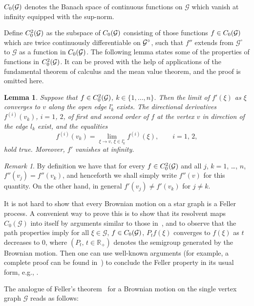 \documentclass[11pt,a4paper]{amsart}
\newcommand{\cG}{\mathcal{G}}
\newcommand{\1}{1}
\newcommand{\R}{\mathbb{R}}
\newtheorem{lemma}[theorem]{Lemma}
\theoremstyle{remark}
\newtheorem{remark}[theorem]{Remark}
\newcommand{\op}{\ensuremath^\circ}
\newcommand{\cGo}{\ensuremath\cG\op}
\newcommand{\Co}{\ensuremath C_0(\cG)}
\newcommand{\Cii}{\ensuremath C_0^2(\cG)}
\numberwithin{equation}{section}
\begin{document}
$\Co$ denotes the Banach space of continuous functions on $\cG$ which vanish at infinity
equipped with the sup-norm.

Define $\Cii$ as the subspace of $\Co$ consisting of those
functions $f\in\Co$ which are twice continuously differentiable on $\cGo$, such that
$f''$ extends from $\cG^\circ$ to $\cG$ as a function in $\Co$. The following
lemma states some of the properties of functions in $\Cii$. It can be proved
with the help of applications of the fundamental theorem of calculus and the
mean value theorem, and the proof is omitted here.

\begin{lemma}	\label{lemC02}
Suppose that $f\in\Cii$, $k\in\{1,\dotsc,n\}$. Then the limit of $f'(\xi)$ as
$\xi$ converges to $v$ along the open edge $l_k^\circ$ exists. The directional derivatives
$f^{(i)}(v_k)$, $i=1$, $2$, of first and second order of $f$ at the vertex $v$ in
direction of the edge $l_k$ exist, and the equalities
\begin{equation*}
	f^{(i)}(v_k) = \lim_{\xi\to v,\,\xi\in l_k^\circ} f^{(i)}(\xi),\qquad
											i=1,\,2,
\end{equation*}
hold true. Moreover, $f'$ vanishes at infinity.
\end{lemma}

\begin{remark}	\label{remC02}
By definition we have that for every $f\in\Cii$ and all $j$, $k=1$, \dots, $n$,
$f''(v_j) = f''(v_k)$, and henceforth we shall simply write $f''(v)$ for this
quantity. On the other hand, in general $f'(v_j)\ne f'(v_k)$ for $j\ne k$.
\end{remark}

It is not hard to show that every Brownian motion on a star graph is a Feller process.
A convenient way to prove this is to show that its resolvent maps $C_0(\cG)$ into itself
by arguments similar to those in~\cite[Section~3.6]{ItMc74},
and to observe that the path properties imply for all $\xi\in\cG$,
$f\in\Co$, $P_t f(\xi)$ converges to $f(\xi)$ as $t$ decreases to $0$, where
$(P_t,\,t\in\R_+)$ denotes the semigroup generated by the Brownian motion.
Then one can use well-known arguments (for example, a complete proof can be found
in~\cite{NFSG}) to conclude the Feller property in its usual form, e.g., \cite{ReYo91}.

The analogue of Feller's theorem~\cite[Theorem~6.2]{Kn81} for a Brownian
motion on the single vertex graph $\cG$ reads as follows:
\end{document}
